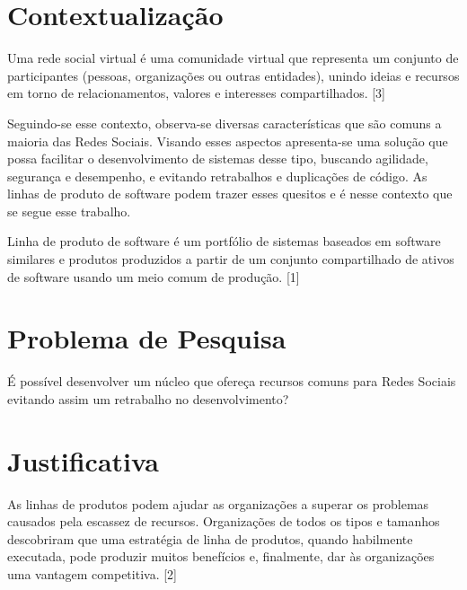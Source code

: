 









\frenchspacing 
\imprimircapa

\textual

\section*{Contextualização}

Uma rede social virtual é uma comunidade virtual que representa um conjunto de participantes (pessoas, organizações ou outras entidades), unindo ideias e recursos em torno de relacionamentos, valores e interesses compartilhados. [3]

Seguindo-se esse contexto, observa-se diversas características que são comuns a maioria das Redes Sociais. Visando esses aspectos apresenta-se uma solução que possa facilitar o desenvolvimento de sistemas desse tipo, buscando agilidade, segurança e desempenho, e evitando retrabalhos e duplicações de código. As linhas de produto de software podem trazer esses quesitos e é nesse contexto que se segue esse trabalho.

Linha de produto de software é um portfólio de sistemas baseados em software similares e produtos produzidos a partir de um conjunto compartilhado de ativos de software usando um meio comum de produção. [1]

\section*{Problema de Pesquisa}

É possível desenvolver um núcleo que ofereça recursos comuns para Redes Sociais evitando assim um retrabalho no desenvolvimento?

\section*{Justificativa}

As linhas de produtos podem ajudar as organizações a superar os problemas causados pela escassez de recursos. Organizações de todos os tipos e tamanhos descobriram que uma estratégia de linha de produtos, quando habilmente executada, pode produzir muitos benefícios e, finalmente, dar às organizações uma vantagem competitiva. [2]

